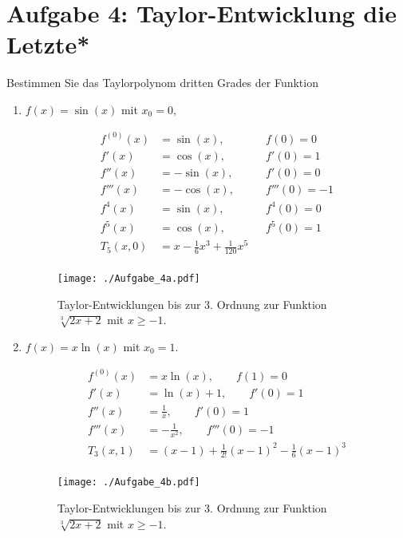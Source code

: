 \documentclass[11pt,a4paper, parskip=half ]{report}
\begin{document}
  \section*{Aufgabe 4:  Taylor-Entwicklung die Letzte*}
  Bestimmen Sie das Taylorpolynom dritten Grades der Funktion \begin{enumerate}
    \item $f(x) = \sin(x)$ mit $x_0 = 0$,
    
    \vspace{20pt}
  \begin{align*}
  f^{(0)}(x) &= \sin(x), \qquad &f(0) = 0 \\ 
  f'(x)      &= \cos(x), \qquad &f'(0) = 1 \\
  f''(x)     &= -\sin(x), \qquad &f'(0) = 0 \\
  f'''(x)    &= -\cos(x), \qquad &f'''(0) = -1 \\
  f^{4}(x)    &= \sin(x), \qquad &f^{4}(0) = 0 \\
  f^{5}(x)    &= \cos(x), \qquad &f^{5}(0) = 1 \\
  T_5 (x, 0) &= x - \frac{1}{6} x^3 + \frac{1}{120} x^5  &\\
  \end{align*}

  \begin{figure}
    \centering
    \texttt{[image: ./Aufgabe\_4a.pdf]}
    \caption{Taylor-Entwicklungen bis zur 3. Ordnung zur Funktion $\sqrt[3]{2x+2}$ mit $x\geq -1$.}
    \label{fig:feynman2}
  \end{figure}

    \item $f(x) = x \ln(x)$ mit $x_0 = 1$. 
    
    \vspace{20pt}
    \begin{align*}
    f^{(0)}(x) &= x \ln(x), \qquad f(1) = 0 \\ 
    f'(x)      &= \ln(x) + 1, \qquad f'(0) = 1 \\
    f''(x)     &= \frac{1}{x}, \qquad f'(0) = 1 \\
    f'''(x)    &= -\frac{1}{x^2} , \qquad f'''(0) = -1 \\
    T_3 (x, 1) &= (x -1) + \frac{1}{2!} (x-1)^2 - \frac{1}{6} (x-1)^3 \\
    \end{align*}

    \begin{figure}
      \centering
      \texttt{[image: ./Aufgabe\_4b.pdf]}
      \caption{Taylor-Entwicklungen bis zur 3. Ordnung zur Funktion $\sqrt[3]{2x+2}$ mit $x\geq -1$.}
      \label{fig:feynman2}
    \end{figure}

  \end{enumerate}
\end{document}
